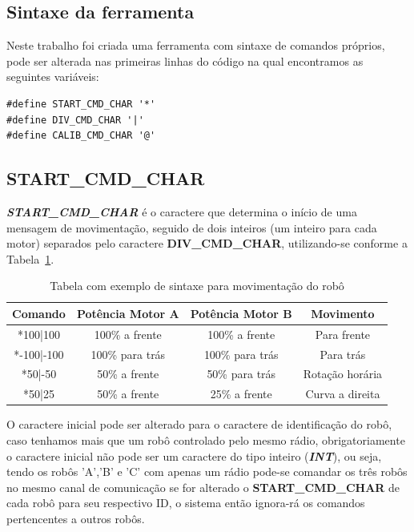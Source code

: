 \documentclass[a4paper,12pt,portuguese]{ufms-cpcx}
\begin{document}
\subsection{Sintaxe da ferramenta}\label{sintaxe}
Neste trabalho foi criada uma ferramenta com sintaxe de comandos próprios, pode ser alterada nas primeiras linhas do código na qual encontramos as seguintes variáveis:
\begin{lstlisting}
#define START_CMD_CHAR '*'
#define DIV_CMD_CHAR '|'
#define CALIB_CMD_CHAR '@'
\end{lstlisting}

\subsection*{\textbf{START\_CMD\_CHAR}}\label{stardcmd}
\textbf{\textit{START\_CMD\_CHAR}} é o caractere que determina o início de uma mensagem de movimentação, seguido de dois inteiros (um inteiro para cada motor) separados pelo caractere \textbf{DIV\_CMD\_CHAR}, utilizando-se conforme a Tabela~\ref{Tab:exemplosintaxe}.

\begin{table}[!h]
	\renewcommand{\arraystretch}{1.3}
	\centering
	\begin{tabular}{|c|cc|c|}
		\hline
		 Comando   & Potência Motor A & Potência Motor B &    Movimento    \\ \hline
		 *100|100  &  100\% a frente  &  100\% a frente  &   Para frente   \\
		*-100|-100 & 100\% para trás  & 100\% para trás  &    Para trás    \\
		 *50|-50   &  50\% a frente   &  50\% para trás  & Rotação horária \\
		  *50|25   &  50\% a frente   &  25\% a frente   & Curva a direita \\ \hline
	\end{tabular}
	\caption[Comandos]{Tabela com exemplo de sintaxe para movimentação do robô}
	\label{Tab:exemplosintaxe}
\end{table}

\vspace{1.0cm}

O caractere inicial pode ser alterado para o caractere de identificação do robô, caso tenhamos mais que um robô controlado pelo mesmo rádio, obrigatoriamente o caractere inicial não pode ser um caractere do tipo inteiro (\textbf{\textit{INT}}), ou seja, tendo os robôs 'A','B' e 'C' com apenas um rádio pode-se comandar os três robôs no mesmo canal de comunicação se for alterado o \textbf{START\_CMD\_CHAR} de cada robô para seu respectivo ID, o sistema então ignora-rá os comandos pertencentes a outros robôs.
\end{document}
